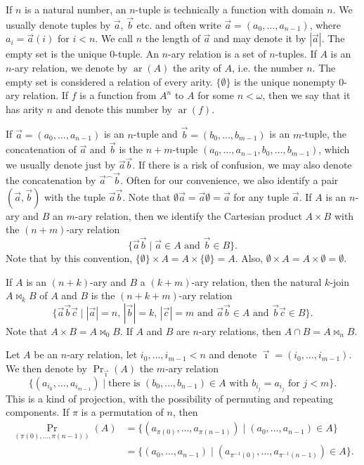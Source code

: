 \documentclass[a4paper]{amsart}
\theoremstyle{definition}
\theoremstyle{remark}
\DeclareMathOperator{\ar}{ar}
\theoremstyle{definition}
\begin{document}
If $n$ is a natural number, an $n$-tuple is technically a function with domain $n$. We usually denote tuples by $\vec a$, $\vec b$ etc. and often write $\vec a = (a_0,\dots,a_{n-1})$, where $a_i = \vec a(i)$ for $i<n$. We call $n$ the length of $\vec a$ and may denote it by $|\vec a|$. The empty set is the unique $0$-tuple. An $n$-ary relation is a set of $n$-tuples. If $A$ is an $n$-ary relation, we denote by $\ar(A)$ the arity of $A$, i.e. the number $n$. The empty set is considered a relation of every arity. $\{\emptyset\}$ is the unique nonempty $0$-ary relation. If $f$ is a function from $A^n$ to $A$ for some $n<\omega$, then we say that it has arity $n$ and denote this number by $\ar(f)$.

If $\vec a = (a_0,\dots,a_{n-1})$ is an $n$-tuple and $\vec b = (b_0,\dots,b_{m-1})$ is an $m$-tuple, the concatenation of $\vec a$ and $\vec b$ is the $n+m$-tuple $(a_0,\dots,a_{n-1},b_0,\dots,b_{m-1})$, which we usually denote just by $\vec a\vec b$. If there is a risk of confusion, we may also denote the concatenation by $\vec a^\frown\vec b$. Often for our convenience, we also identify a pair $(\vec a,\vec b)$ with the tuple $\vec a\vec b$. Note that $\emptyset\vec a = \vec a\emptyset = \vec a$ for any tuple $\vec a$. If $A$ is an $n$-ary and $B$ an $m$-ary relation, then we identify the Cartesian product $A\times B$ with the $(n+m)$-ary relation
\[
    \{ \vec a\vec b \mid \text{$\vec a\in A$ and $\vec b\in B$} \}.
\]
Note that by this convention, $\{\emptyset\}\times A = A\times\{\emptyset\} = A$. Also, $\emptyset\times A = A\times\emptyset = \emptyset$.

If $A$ is an $(n+k)$-ary and $B$ a $(k+m)$-ary relation, then the natural $k$-join $A\bowtie_k B$ of $A$ and $B$ is the $(n+k+m)$-ary relation
\[
    \{ \vec a\vec b\vec c \mid \text{$|\vec a|=n$, $|\vec b|=k$, $|\vec c|=m$ and $\vec a\vec b\in A$ and $\vec b\vec c\in B$} \}.
\]
Note that $A\times B = A\bowtie_0 B$. If $A$ and $B$ are $n$-ary relations, then $A\cap B = A\bowtie_n B$.

Let $A$ be an $n$-ary relation, let $i_0,\dots,i_{m-1}<n$ and denote $\vec\imath = (i_0,\dots,i_{m-1})$. We then denote by $\Pr_{\vec\imath}(A)$ the $m$-ary relation
\[
    \{ (a_{i_0},\dots,a_{i_{m-1}}) \mid \text{there is $(b_0,\dots,b_{n-1})\in A$ with $b_{i_j} = a_{i_j}$ for $j<m$} \}.
\]
This is a kind of projection, with the possibility of permuting and repeating components. If $\pi$ is a permutation of $n$, then
\begin{align*}
    \Pr_{(\pi(0),\dots,\pi(n-1))}(A) &= \{ (a_{\pi(0)},\dots,a_{\pi(n-1)}) \mid (a_0,\dots,a_{n-1})\in A \} \\
    &= \{ (a_0,\dots,a_{n-1}) \mid (a_{\pi^{-1}(0)},\dots,a_{\pi^{-1}(n-1)})\in A \}.
\end{align*}
\end{document}
